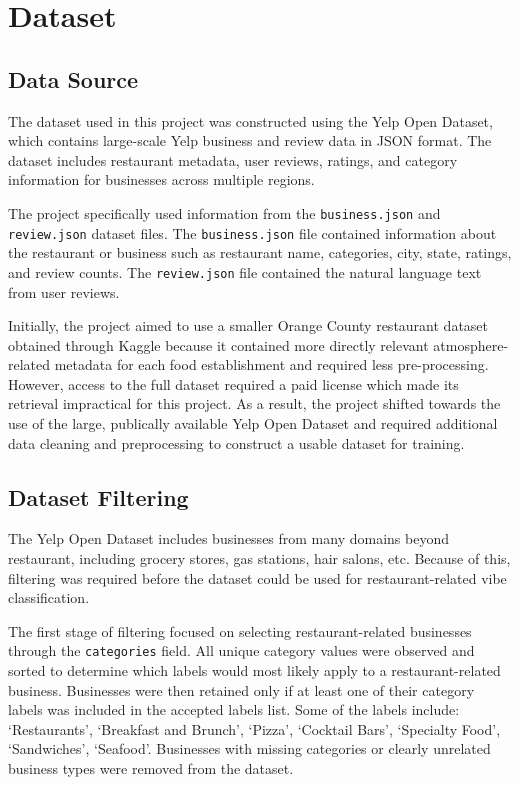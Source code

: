 \documentclass[11pt]{article}
\begin{document}
\section{Dataset}

\subsection{Data Source}

The dataset used in this project was constructed using the Yelp Open Dataset, which contains large-scale Yelp business 
and review data in JSON format. The dataset includes restaurant metadata, user reviews, ratings, and category information 
for businesses across multiple regions.

\medbreak \noindent The project specifically used information from the \texttt{business.json} and \texttt{review.json} dataset files. 
The \texttt{business.json} file contained information about the restaurant or business such as restaurant name, categories, city, state, 
ratings, and review counts. The \texttt{review.json} file contained the natural language text from user reviews. 

\medbreak \noindent Initially, the project aimed to use a smaller Orange County restaurant dataset obtained through Kaggle 
because it contained more directly relevant atmosphere-related metadata for each food establishment and required less pre-processing. 
However, access to the full dataset required a paid license which made its retrieval impractical for this project. As a result, the 
project shifted towards the use of the large, publically available Yelp Open Dataset and required additional data cleaning 
and preprocessing to construct a usable dataset for training. 


\subsection{Dataset Filtering}

The Yelp Open Dataset includes businesses from many domains beyond restaurant, including grocery stores, gas stations, hair salons, 
etc. Because of this, filtering was required before the dataset could be used for restaurant-related vibe classification. 

\medbreak \noindent The first stage of filtering focused on selecting restaurant-related businesses through the \texttt{categories} 
field. All unique category values were observed and sorted to determine which labels would most likely apply to a restaurant-related business. 
Businesses were then retained only if at least one of their category labels was included in the accepted labels list. Some of the labels include: 
`Restaurants', `Breakfast and Brunch', `Pizza', `Cocktail Bars', `Specialty Food', `Sandwiches', `Seafood'. Businesses with missing categories 
or clearly unrelated business types were removed from the dataset.
\end{document}
